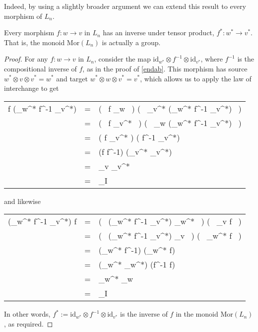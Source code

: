 \documentclass{amsbook} %
\numberwithin{section}{chapter}
\begin{document}
Indeed, by using a slightly broader argument we can extend this result to every morphism of $L_n$.

\begin{prop} \label{tensinv} Every morphism $f: w \to v$ in $L_n$ has an inverse under tensor product, $f^*: w^* \to v^*$. That is, the monoid $\mathrm{Mor}(L_n)$ is actually a group.
\end{prop}
\begin{proof}
For any $f: w \to v$ in $L_n$, consider the map $\mathrm{id}_{w^*} \otimes f^{-1} \otimes \mathrm{id}_{v^*}$, where $f^{-1}$ is the compositional inverse of $f$, as in the proof of \cref{endab}. This morphism has source $w^* \otimes v \otimes v^* = w^*$ and target $w^* \otimes w \otimes v^* = v^*$, which allows us to apply the law of interchange to get
\begin{longtable}{RLL}
			f \otimes (_{w^*} \otimes f^{-1} \otimes {}_{v^*}) & = & \big( \, f \circ {}_w \, \big) \otimes \big( \, _{v^*} \circ  (_{w^*} \otimes f^{-1} \otimes {}_{v^*}) \, \big) \\
			& = & \big( \, f \otimes {}_{v^*} \, \big) \circ \big( \, _w \otimes (_{w^*} \otimes f^{-1} \otimes {}_{v^*}) \, \big) \\
			& = & ( f \otimes {}_{v^*} ) \circ ( f^{-1} \otimes {}_{v^*}) \\
			& = & (f \circ f^{-1}) \otimes (_{v^*} \circ {}_{v^*}) \\
			& = & _v \otimes {}_{v^*} \\
			& = & _I
\end{longtable}
and likewise
\begin{longtable}{RLL}
			(_{w^*} \otimes f^{-1} \otimes {}_{v^*}) \otimes f & = & \big( \, (_{w^*} \otimes f^{-1} \otimes {}_{v^*}) \circ {}_{w^*} \, \big) \otimes \big( \, _v \circ f \, \big) \\
			& = & \big( \, (_{w^*} \otimes f^{-1} \otimes {}_{v^*}) \otimes {}_v \, \big) \circ \big( \, _{w^*} \otimes f \, \big) \\
			& = & (_{w^*} \otimes f^{-1}) \circ (_{w^*} \otimes f) \\
			& = & (_{w^*} \circ {}_{w^*}) \otimes (f^{-1} \circ f)\\
			& = & _{w^*} \otimes {}_w \\
			& = & _I
\end{longtable}
In other words, $f^* := \mathrm{id}_{w^*} \otimes f^{-1} \otimes \mathrm{id}_{v^*}$ is the inverse of $f$ in the monoid $\mathrm{Mor}(L_n)$, as required.
\end{proof}
\end{document}
